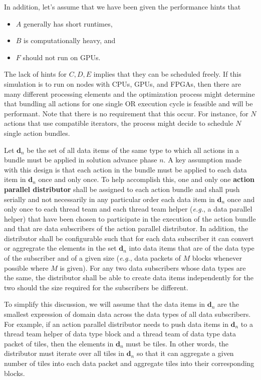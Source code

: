 \documentclass{article}
\newcommand{\eg}{\textit{e.g.}}   %
\newcommand{\shortOR}   {OR\xspace}
\newcommand{\OR}        {\shortOR}
\begin{document}
In addition, let's assume that we have been given the performance hints that
\begin{itemize}
\item{$A$ generally has short runtimes,}
\item{$B$ is computationally heavy, and}
\item{$F$ should not run on GPUs.}
\end{itemize}
The lack of hints for $C,D,E$ implies that they can be scheduled freely.
If this simulation is to run on nodes with CPUs, GPUs, and FPGAs, then there are
many different processing elements and the optimization process might determine
that bundling all actions for one single \OR execution cycle is feasible and
will be performant.  Note that there is no requirement that this occur.  For
instance, for $N$ actions that use compatible iterators, the process might
decide to schedule $N$ single action bundles.

\begin{req}
\label{req:ActionParallelDistributor}
Let $\mathbf{d}_n$ be the set of all data items of the same type to which all
actions in a bundle must be applied in solution advance phase $n$.  A key
assumption made with this design is that each action in the bundle must be
applied to each data item in $\mathbf{d}_n$ once and only once.  To help
accomplish this, one and only one \textbf{action parallel distributor} shall be
assigned to each action bundle and shall push serially and not necessarily in
any particular order each data item in $\mathbf{d}_n$ once and only once to each
thread team and each thread team helper (\eg, a data parallel helper) that have
been chosen to participate in the execution of the action bundle and that are
data subscribers of the action parallel distributor.  In addition, the
distributor shall be configurable such that for each data subscriber it can
convert or aggregrate the elements in the set $\mathbf{d}_n$ into data items
that are of the data type of the subscriber and of a given size (\eg, data
packets of $M$ blocks whenever possible where $M$ is given).  For any two data
subscribers whose data types are the same, the distributor shall be able to
create data items independently for the two should the size required for the
subscribers be different.
\end{req}

To simplify this discussion, we will assume that the data items in $\mathbf{d}_n$
are the smallest expression of domain data across the data types of all data
subscribers.  For example, if an action parallel distributor needs
to push data items in $\mathbf{d}_n$ to a thread team helper of data type block
and a thread team of data type data packet of tiles, then the elements in
$\mathbf{d}_n$ must be tiles.  In other words, the distributor must iterate over
all tiles in $\mathbf{d}_n$ so that it can aggregate a given number of tiles
into each data packet and aggregate tiles into their corresponding blocks.
\end{document}
